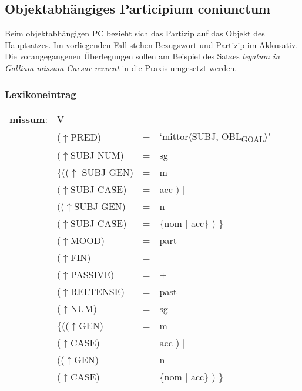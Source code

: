 \documentclass[12pt,a4paper]{article}
\begin{document}
\subsection{Objektabhängiges Participium coniunctum}
Beim objektabhängigen PC bezieht sich das Partizip auf das Objekt des Hauptsatzes. Im vorliegenden Fall stehen Bezugswort und Partizip im Akkusativ. \\
Die vorangegangenen Überlegungen sollen am Beispiel des Satzes \textit{legatum in Galliam missum Caesar revocat} in die Praxis umgesetzt werden.

\subsubsection{Lexikoneintrag}
\begin{singlespace}
\begin{tabular}{ l  l  l  l  } 
\textbf{missum}: & \: V \\
$\qquad$ & \:  ($\uparrow$PRED) & = & `mittor$\langle$SUBJ, OBL\textsubscript{GOAL}$\rangle$'\\
$\qquad$ & \:  ($\uparrow$SUBJ NUM) & =  & sg \\
$\qquad$ & \:  \{(($\uparrow$ SUBJ GEN) & = & m \\ 
$\qquad$ & \: \: \: ($\uparrow$SUBJ CASE) & = & acc ) $\mid$\\
$\qquad$ & \: \: (($\uparrow$SUBJ GEN) & = & n \\
$\qquad$ & \: \: \: ($\uparrow$SUBJ CASE) & = & \{nom $\mid$ acc\} ) \}\\
$\qquad$ & \:  ($\uparrow$MOOD) & = & part\\
$\qquad$ & \:  ($\uparrow$FIN) & = & - \\
$\qquad$ & \:  ($\uparrow$PASSIVE) & = & + \\
$\qquad$ & \:  ($\uparrow$RELTENSE) & = & past \\
$\qquad$ & \:  ($\uparrow$NUM) & = & sg \\
$\qquad$ & \:  \{(($\uparrow$GEN) & = & m \\ 
$\qquad$ & \: \: \: ($\uparrow$CASE) & = & acc ) $\mid$\\
$\qquad$ & \: \: (($\uparrow$GEN) & = & n \\
$\qquad$ & \: \: \: ($\uparrow$CASE) & = & \{nom $\mid$ acc\} ) \}\\
\end{tabular}
\newline
\newline
\end{singlespace}
\end{document}

